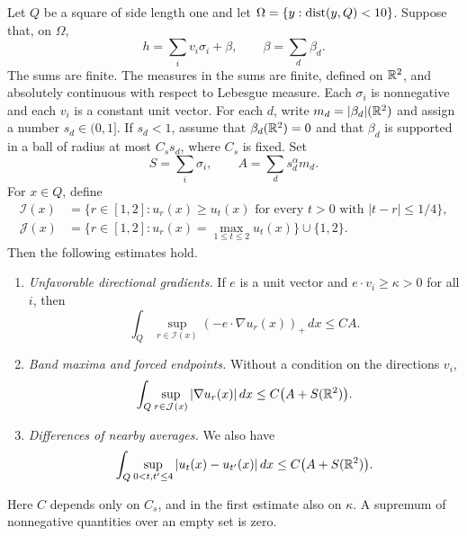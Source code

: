 \begin{lemma}\label{lem:local}
Let $Q$ be a square of side length one and let
$\Omega=\{y:\operatorname{dist}(y,Q)<10\}$. Suppose that, on $\Omega$,
\begin{equation}\label{eq:local-decomposition}
h=\sum_i v_i\sigma_i+\beta,
\qquad \beta=\sum_d\beta_d.
\end{equation}
The sums are finite. The measures in the sums are finite, defined on
$\mathbb R^2$, and absolutely continuous with respect to Lebesgue measure.
Each $\sigma_i$ is nonnegative and each $v_i$ is a constant unit vector.
For each $d$, write $m_d=|\beta_d|(\mathbb R^2)$ and assign a number
$s_d\in(0,1]$. If $s_d<1$, assume that
$\beta_d(\mathbb R^2)=0$ and that $\beta_d$ is supported in a ball of radius
at most $C_s s_d$, where $C_s$ is fixed. Set
\[
S=\sum_i\sigma_i,
\qquad A=\sum_d s_d^\alpha m_d.
\]
For $x\in Q$, define
\begin{align*}
\mathcal I(x)
&=\{r\in[1,2]:u_r(x)\ge u_t(x)
                 \text{ for every }t>0\text{ with }|t-r|\le1/4\},\\
\mathcal J(x)
&=\{r\in[1,2]:u_r(x)=\max_{1\le t\le2}u_t(x)\}\cup\{1,2\}.
\end{align*}
Then the following estimates hold.
\begin{enumerate}
\item \emph{Unfavorable directional gradients.} If $e$ is a unit vector and $e\cdot v_i\ge\kappa>0$ for all $i$,
then
\begin{equation}\label{eq:local-direction}
\int_Q\sup_{r\in\mathcal I(x)}
                  (-e\cdot\nabla u_r(x))_+\,dx\le C A.
\end{equation}
\item \emph{Band maxima and forced endpoints.} Without a condition on the directions $v_i$,
\begin{equation}\label{eq:local-size}
\int_Q\sup_{r\in\mathcal J(x)}|\nabla u_r(x)|\,dx
    \le C\bigl(A+S(\mathbb R^2)\bigr).
\end{equation}
\item \emph{Differences of nearby averages.} We also have
\begin{equation}\label{eq:local-value}
\int_Q\sup_{0<t,t'\le4}|u_t(x)-u_{t'}(x)|\,dx
    \le C\bigl(A+S(\mathbb R^2)\bigr).
\end{equation}
\end{enumerate}
Here $C$ depends only on $C_s$, and in the first estimate also on
$\kappa$. A supremum of nonnegative quantities over an empty set is zero.
\end{lemma}


